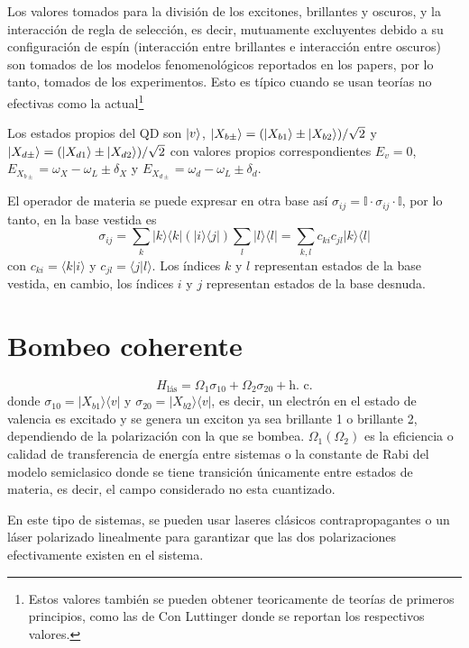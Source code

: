 \documentclass[main.tex]{subfiles}
\begin{document}
Los valores tomados para la división de los excitones, brillantes y oscuros, y la interacción de regla de selección, es decir, mutuamente excluyentes debido a su configuración de espín (interacción entre brillantes e interacción entre oscuros) son tomados de los modelos fenomenológicos reportados en los papers, por lo tanto, tomados de los experimentos. Esto es típico cuando se usan teorías no efectivas como la actual\footnote{Estos valores también se pueden obtener teoricamente de teorías de primeros principios, como las de Con Luttinger donde se reportan los respectivos valores.}

Los estados propios del QD son $\ket{v}$, $\ket{X_{b\pm}} = (\ket{X_{b1}} \pm \ket{X_{b2}})/\sqrt{2}$ y $\ket{X_{d\pm}} = (\ket{X_{d1}} \pm \ket{X_{d2}})/\sqrt{2}$ con valores propios correspondientes $E_v = 0$, $E_{X_{b\pm}} = \omega_X - \omega_L \pm \delta_X$ y $E_{X_{d\pm}} = \omega_d - \omega_L \pm \delta_d$.

El operador de materia se puede expresar en otra base así $\sigma_{ij} = \mathbb{I} \cdot \sigma_{ij} \cdot \mathbb{I}$, por lo tanto, en la base vestida es
\begin{equation}
\sigma_{ij}= 
\sum_k |k\rangle\langle k|(|i\rangle \langle j|) \sum_l |l\rangle\langle l| = \sum_{k,l} c_{ki} c_{jl} |k\rangle\langle l| 
\end{equation}
con $c_{ki} = \langle k|i\rangle$ y $c_{jl} = \langle j|l\rangle$. Los índices $k$ y $l$ representan estados de la base vestida, en cambio, los índices $i$ y $j$ representan estados de la base desnuda.
\section{Bombeo coherente}
$$H_\text{l\'as} = \Omega_1 \sigma_{10} + \Omega_2 \sigma_{20} + \text{h. c.}$$
donde $\sigma_{10}=|X_{b1}\rangle\langle v|$  y $\sigma_{20}=|X_{b2}\rangle\langle v|$, es decir, un electrón en el estado de valencia es excitado y se genera un exciton ya sea brillante 1 o brillante 2, dependiendo de la polarización con la que se bombea. $\Omega_1 (\Omega_2)$ es la eficiencia o calidad de transferencia de energía entre sistemas o la constante de Rabi del modelo semiclasico donde se tiene transición  únicamente entre estados de materia, es decir, el campo considerado no esta cuantizado.

En este tipo de sistemas, se pueden usar laseres clásicos contrapropagantes o un láser polarizado linealmente para garantizar que las dos polarizaciones efectivamente existen en el sistema.
\end{document}

